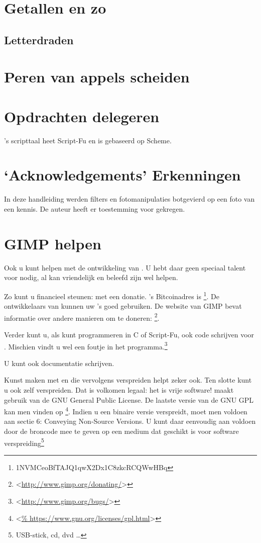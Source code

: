\documentclass[11pt,a5paper,twoside]{book}
\newcommand{\BETEREURL}[1]{\mbox{<\url{#1}>}}
\begin{document}
 \chapter{Getallen en zo}\label{scr:getallen}%
  \section{Letterdraden}
 \chapter{Peren van appels scheiden}\label{scr:peren}%
 \chapter{Opdrachten delegeren}\label{scr:delegeren}%
  \label{scr:herhalen}%
\GIMP{}’s
  script\-taal heet Script-Fu en is ge\-ba\-seerd op Scheme.
\fi
\appendix{}
\chapter{‘Acknowledgements’ Erkenningen}
 In deze handleiding werden filters en fotomanipulaties botgevierd op
  een foto van een kennis. De auteur heeft er toestemming voor gekregen.
\chapter{GIMP helpen}
 Ook u kunt helpen met de ontwikkeling van \GIMP{}. U hebt daar geen speciaal
  talent voor nodig, al kan vriendelijk en beleefd zijn wel helpen.

 Zo kunt u \GIMP{} financieel steunen: met een donatie.
 \GIMP{}’s Bitcoinadres is \footnote{1NVMCeoBfTAJQ1qwX2Dx1C8zkcRCQWwHBq}. De
  ontwikkelaars van \GIMP{} kunnen uw ’s goed gebruiken. De website van GIMP bevat informatie
  over andere manieren om te doneren: \footnote{%
   \BETEREURL{http://www.gimp.org/donating/}}.

 Verder kunt u, als kunt programmeren in C of Script-Fu,
  ook code schrijven voor \GIMP{}. Mischien vindt u wel
  een foutje in het programma.\footnote{%
  \BETEREURL{http://www.gimp.org/bugs/}%
 }

 U kunt ook documentatie schrijven.

 Kunst maken met \GIMP{} en die vervolgens verspreiden helpt zeker ook.
 Ten slotte kunt u ook \GIMP{} zelf verspreiden. Dat is volkomen legaal:
  het is vrije software! \GIMP{} maakt gebruik van de GNU General Public
  License.
 De laatste versie van de GNU GPL kan men vinden op \footnote{\BETEREURL{%
  https://www.gnu.org/licenses/gpl.html}}.
 Indien u een binaire versie verspreidt, moet men voldoen aan sectie 6:
  Conveying Non-Source Versions. U kunt daar eenvoudig aan voldoen door
  de broncode mee te geven op een medium dat geschikt is voor software%
  verspreiding\footnote{USB-stick, cd, dvd …}
\end{document}
